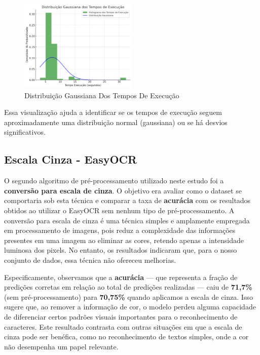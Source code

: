 \documentclass[conference]{IEEEtran}
\begin{document}
\begin{figure}[htbp]
	\centerline{\includegraphics[width=0.5\textwidth]{img6.png}}
	\caption{Distribuição Gaussiana Dos Tempos De Execução}
	\label{img6}
\end{figure}

Essa visualização ajuda a identificar se os tempos de execução seguem aproximadamente uma distribuição normal (gaussiana) ou se há desvios significativos.


\subsection{Escala Cinza - EasyOCR}

O segundo algoritmo de pré-processamento utilizado neste estudo foi a \textbf{conversão para escala de cinza}. O objetivo era avaliar como o dataset se comportaria sob esta técnica e comparar a taxa de \textbf{acurácia} com os resultados obtidos ao utilizar o EasyOCR sem nenhum tipo de pré-processamento. A conversão para escala de cinza é uma técnica simples e amplamente empregada em processamento de imagens, pois reduz a complexidade das informações presentes em uma imagem ao eliminar as cores, retendo apenas a intensidade luminosa dos pixels. No entanto, os resultados indicaram que, para o nosso conjunto de dados, essa técnica não ofereceu melhorias.

Especificamente, observamos que a \textbf{acurácia} — que representa a fração de predições corretas em relação ao total de predições realizadas — caiu de \textbf{71,7\%} (sem pré-processamento) para \textbf{70,75\%} quando aplicamos a escala de cinza. Isso sugere que, ao remover a informação de cor, o modelo perdeu alguma capacidade de diferenciar certos padrões visuais importantes para o reconhecimento de caracteres. Este resultado contrasta com outras situações em que a escala de cinza pode ser benéfica, como no reconhecimento de textos simples, onde a cor não desempenha um papel relevante.
\end{document}

